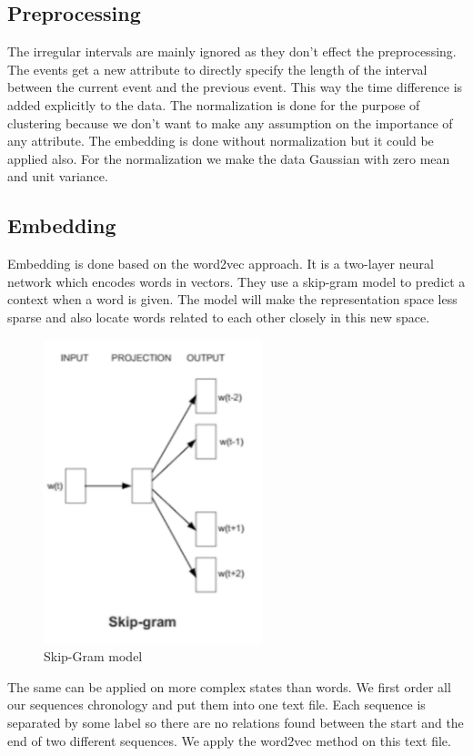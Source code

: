 \documentclass[journal]{IEEETemplate/IEEEtran}
\begin{document}
\subsection{Preprocessing}
The irregular intervals are mainly ignored as they don't effect the preprocessing. The events get a new attribute to directly specify the length of the interval between the current event and the previous event. This way the time difference is added explicitly to the data. The normalization is done for the purpose of clustering because we don't want to make any assumption on the importance of any attribute\cite{14}. The embedding is done without normalization but it could be applied also\cite{15}. For the normalization we make the data Gaussian with zero mean and unit variance.

\subsection{Embedding}
Embedding is done based on the word2vec approach\cite{13}. It is a two-layer neural network which encodes words in vectors. They use a skip-gram model to predict a context when a word is given. The model will make the representation space less sparse and also locate words related to each other closely in this new space.

\begin{figure}[H]
\centering
\includegraphics[width=2.5in]{../Figures/skipGram.pdf}
\caption{Skip-Gram model}
\label{fig:skipgram}
\end{figure}

The same can be applied on more complex states than words. We first order all our sequences chronology and put them into one text file. Each sequence is separated by some label so there are no relations found between the start and the end of two different sequences. We apply the word2vec method on this text file. 
\end{document}
